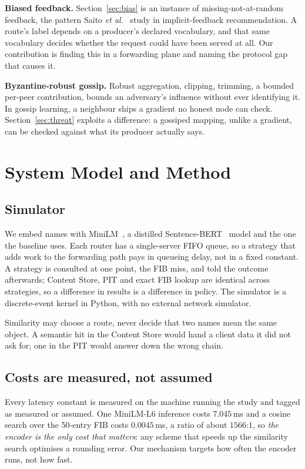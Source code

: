 \documentclass[conference,a4paper]{IEEEtran}
\begin{document}
\textbf{Biased feedback.} Section~\ref{sec:bias} is an instance of
missing-not-at-random feedback, the pattern Saito \emph{et
al.}~\cite{saito2020unbiased} study in implicit-feedback recommendation. A
route's label depends on a producer's declared vocabulary, and that same
vocabulary decides whether the request could have been served at all. Our
contribution is finding this in a forwarding plane and naming the protocol
gap that causes it.

\textbf{Byzantine-robust gossip.} Robust aggregation, clipping, trimming, a
bounded per-peer contribution, bounds an adversary's influence without ever
identifying it. In gossip learning, a neighbour ships a gradient no honest
node can check. Section~\ref{sec:threat} exploits a difference: a gossiped
mapping, unlike a gradient, can be checked against what its producer
actually says.

\section{System Model and Method}
\label{sec:method}

\subsection{Simulator}

We embed names with MiniLM~\cite{wang2020minilm}, a distilled
Sentence-BERT~\cite{reimers2019sbert} model and the one the baseline uses. Each router has a single-server FIFO
queue, so a strategy that adds work to the forwarding path pays in queueing
delay, not in a fixed constant. A strategy is consulted at one point, the FIB
miss, and told the outcome afterwards; Content Store, PIT and exact FIB
lookup are identical across strategies, so a difference in results is a
difference in policy. The simulator is a discrete-event kernel in Python,
with no external network simulator.

Similarity may choose a route, never decide that two names mean the same
object. A semantic hit in the Content Store would hand a client data it did
not ask for; one in the PIT would answer down the wrong chain.

\subsection{Costs are measured, not assumed}

Every latency constant is measured on the machine running the study and
tagged as measured or assumed. One MiniLM-L6 inference costs $7.045$\,ms and
a cosine search over the 50-entry FIB costs $0.0045$\,ms, a ratio of about
$1566$:$1$, so \emph{the encoder is the only cost that matters}: any scheme
that speeds up the similarity search optimises a rounding error. Our
mechanism targets how often the encoder runs, not how fast.
\end{document}

